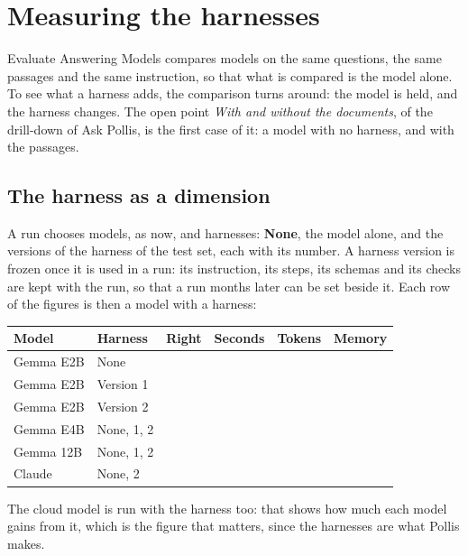 \section{Measuring the harnesses}\label{sec:measure}

Evaluate Answering Models compares models on the same questions, the same passages and the same instruction, so that
what is compared is the model alone. To see what a harness adds, the comparison turns around: the model is held, and
the harness changes. The open point \emph{With and without the documents}, of the drill-down of Ask Pollis, is the
first case of it: a model with no harness, and with the passages.

\subsection{The harness as a dimension}
A run chooses models, as now, and harnesses: \textbf{None}, the model alone, and the versions of the harness of the
test set, each with its number. A harness version is frozen once it is used in a run: its instruction, its steps,
its schemas and its checks are kept with the run, so that a run months later can be set beside it. Each row of the
figures is then a model with a harness:

\begin{center}\small
\renewcommand{\arraystretch}{1.25}
\begin{tabular}{@{}llcccc@{}}
\toprule
\textbf{Model} & \textbf{Harness} & \textbf{Right} & \textbf{Seconds} & \textbf{Tokens} & \textbf{Memory}\\
\midrule
Gemma E2B & None & & & & \\
Gemma E2B & Version 1 & & & & \\
Gemma E2B & Version 2 & & & & \\
Gemma E4B & None, 1, 2 & & & & \\
Gemma 12B & None, 1, 2 & & & & \\
Claude & None, 2 & & & & \\
\bottomrule
\end{tabular}
\end{center}

The cloud model is run with the harness too: that shows how much each model gains from it, which is the figure that
matters, since the harnesses are what Pollis makes.

